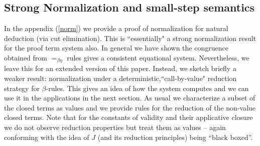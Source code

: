         \subsection{Strong Normalization and small-step semantics}
        In the appendix (\ref{norm}) we provide a proof of normalization for  natural deduction (via cut elimination). 
        This is ``essentially" a strong normalization result for the proof term system also. In general we have shown the congruence obtained from $=_{\beta\eta}$ rules gives a  consistent equational system.
        Nevertheless, we leave this for an extended version of this paper. Instead, we sketch briefly a weaker result: normalization under a  deterministic,``call-by-value" reduction strategy for $\beta$-rules.
        This   gives
        an idea of how the system computes  and we can use it in the applications in the next section. As usual we characterize a subset of the closed terms as values and we provide rules for the reduction of the non-value closed terms.
        Note that for the constants of validity and their applicative closure we do not observe reduction properties but treat them as values -- again conforming with the idea of $J$ (and its reduction principles) being ``black boxed''.
